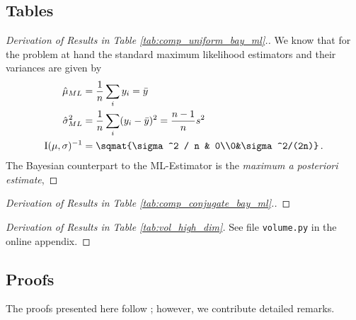 \subsection{Tables}

\begin{proof}[Derivation of Results in Table \ref{tab:comp_uniform_bay_ml}.]
  We know that for the problem at hand the standard maximum likelihood estimators
  and their variances are given by
  \begin{align}
    \hat{\mu}_{ML} &= \frac{1}{n} \sum_i y_i = \bar{y}\,\\
    \hat{\sigma}_{ML}^2 &= \frac{1}{n} \sum_i (y_i - \bar{y})^2 = \frac{n-1}{n} s^2\,\\
    \mathrm{I}(\mu, \sigma)^{-1} &= \sqmat{\sigma^2 / n & 0\\0&\sigma^2/(2n)} \,.
  \end{align}
  The Bayesian counterpart to the ML-Estimator is the \emph{maximum a posteriori estimate},
\end{proof}

\begin{proof}[Derivation of Results in Table \ref{tab:comp_conjugate_bay_ml}.]

\end{proof}

\begin{proof}[Derivation of Results in Table \ref{tab:vol_high_dim}]
See file \lstinline{volume.py}{} in the online appendix.
\end{proof}

\subsection{Proofs}
\begin{remark}
The proofs presented here follow \citet{gelmanbda04}; however, we contribute detailed remarks.
\end{remark}


